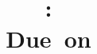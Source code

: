\documentclass{article}
\title{
    \vspace{2in}
    \textmd{\textbf{\hmwkClass:\ \hmwkTitle}}\\
    \normalsize\vspace{0.1in}\small{Due\ on\ \hmwkDueDate}\\
    \vspace{0.1in}\large{\textit{\hmwkClassInstructor\ \hmwkClassTime}}
    \vspace{3in}
}
\author{\hmwkAuthorName}
\date{}
\begin{document}
\maketitle
\pagebreak


\end{document}
